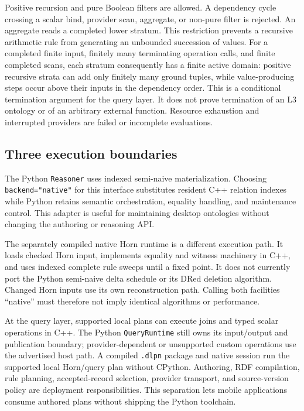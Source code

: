 \documentclass{article}
\newcommand{\code}[1]{\texttt{#1}}
\begin{document}
Positive recursion and pure Boolean filters are allowed. A dependency cycle
crossing a scalar bind, provider scan, aggregate, or non-pure filter is rejected.
An aggregate reads a completed lower stratum. This restriction prevents a
recursive arithmetic rule from generating an unbounded succession of values.
For a completed finite input, finitely many terminating operation calls, and
finite completed scans, each stratum consequently has a finite active domain:
positive recursive strata can add only finitely many ground tuples, while
value-producing steps occur above their inputs in the dependency order. This
is a conditional termination argument for the query layer. It does not prove
termination of an L3 ontology or of an arbitrary external function. Resource
exhaustion and interrupted providers are failed or incomplete evaluations.

\subsection{Three execution boundaries}
The Python \code{Reasoner} uses indexed semi-naive materialization. Choosing
\code{backend="native"} for this interface substitutes resident C++ relation
indexes while Python retains semantic orchestration, equality handling, and
maintenance control. This adapter is useful for maintaining desktop ontologies
without changing the authoring or reasoning API.

The separately compiled native Horn runtime is a different execution path. It
loads checked Horn input, implements equality and witness machinery in C++, and
uses indexed complete rule sweeps until a fixed point. It does not currently
port the Python semi-naive delta schedule or its DRed deletion algorithm.
Changed Horn inputs use its own reconstruction path. Calling both facilities
``native'' must therefore not imply identical algorithms or performance.

At the query layer, supported local plans can execute joins and typed scalar
operations in C++. The Python \code{QueryRuntime} still owns its input/output
and publication boundary; provider-dependent or unsupported custom operations
use the advertised host path. A compiled \code{.dlpn} package and native session
run the supported local Horn/query plan without CPython. Authoring, RDF
compilation, rule planning, accepted-record selection, provider transport, and
source-version policy are deployment responsibilities. This separation lets
mobile applications consume authored plans without shipping the Python toolchain.
\end{document}
